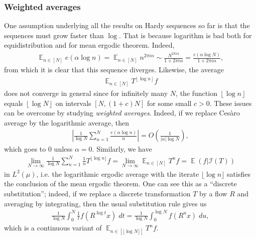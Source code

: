 \documentclass[11pt]{amsart}
\theoremstyle{definition}
\DeclareMathOperator*{\E}{\mathbb{E}}
\newcommand{\CI}{{\mathcal I}}
\newcommand{\norm}[1]{\left\Vert #1\right\Vert}
\newcommand{\1}{{\mathbf{1}}}
\newcommand{\abs}[1]{\mathopen{}\left| #1\mathclose{}\right|}
\newcommand{\brac}[1]{\mathopen{}\left( #1 \mathclose{}\right)}
\newcommand{\floor}[1]{{\left \lfloor #1 \right \rfloor}}
\newcommand{\sfloor}[1]{{\lfloor #1 \rfloor}}
\begin{document}
    \subsubsection{Weighted averages}\label{SSS: weighted averages}
    One assumption underlying all the results on Hardy sequences so far is that the sequences must grow faster than $\log$. That is because logarithm is bad both for equidistribution and for mean ergodic theorem. Indeed, 
    \begin{align*}
        \E_{n\in[N]}e(\alpha \log n) = \E_{n\in[N]}n^{2\pi i \alpha}\sim \frac{N^{2\pi i \alpha}}{1 + 2\pi i \alpha} = \frac{e(\alpha\log N)}{1 + 2\pi i \alpha},
    \end{align*}
    from which it is clear that this sequence diverges. Likewise, the average
    \begin{align*}
        \E_{n\in[N]}T^{\floor{\log n}}f
    \end{align*}
    does not converge in general since for infinitely many $N$, the function $\floor{\log n}$ equals $\floor{\log N}$ on intervals $[N, (1+c)N]$ for some small $c>0$. These issues can be overcome by studying \emph{weighted averages}. Indeed, if we replace Ces\`aro average by the logarithmic average, then
    \begin{align*}
        \abs{\frac{1}{\log N}\sum_{n=1}^N \frac{e(\alpha \log n)}{n}} = O\brac{\frac{1}{|\alpha|\log N}},
    \end{align*}
    which goes to 0 unless $\alpha = 0$. Similarly, we have
    \begin{align*}
        \lim_{N\to\infty}\frac{1}{\log N}\sum_{n=1}^N \frac{1}{n} T^{\sfloor{\log n}}f = \lim_{N\to\infty}\E_{n\in[N]}T^n f = \E(f|\CI(T))
    \end{align*}
    in $L^2(\mu)$,     i.e. the logarithmic ergodic average with the iterate $\sfloor{\log n}$ satisfies the conclusion of the mean ergodic theorem. One can see this as a ``discrete substitution''; indeed, if we replace a discrete transformation $T$ by a flow $R$ and averaging by integrating, then the usual substitution rule gives us
    \begin{align*}
        \frac{1}{\log N}\int_{0}^N \frac{1}{t}f(R^{\log t}x)\; dt = \frac{1}{\log N}\int_{0}^{\log N} f(R^{u}x)\; du,
    \end{align*}
    which is a continuous variant of $\E_{n\in[\sfloor{\log N}]}T^n f$.
    
\end{document}
